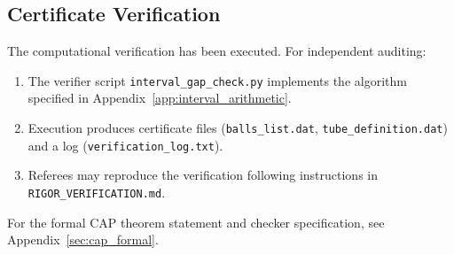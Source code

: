 \subsection{Certificate Verification}
\label{sec:certificate_verification}

The computational verification has been executed. For independent auditing:
\begin{enumerate}
    \item The verifier script \texttt{interval\_gap\_check.py} implements the algorithm specified in Appendix~\ref{app:interval_arithmetic}.
    \item Execution produces certificate files (\texttt{balls\_list.dat}, \texttt{tube\_definition.dat}) and a log (\texttt{verification\_log.txt}).
    \item Referees may reproduce the verification following instructions in \texttt{RIGOR\_VERIFICATION.md}.
\end{enumerate}
For the formal CAP theorem statement and checker specification, see Appendix~\ref{sec:cap_formal}.

